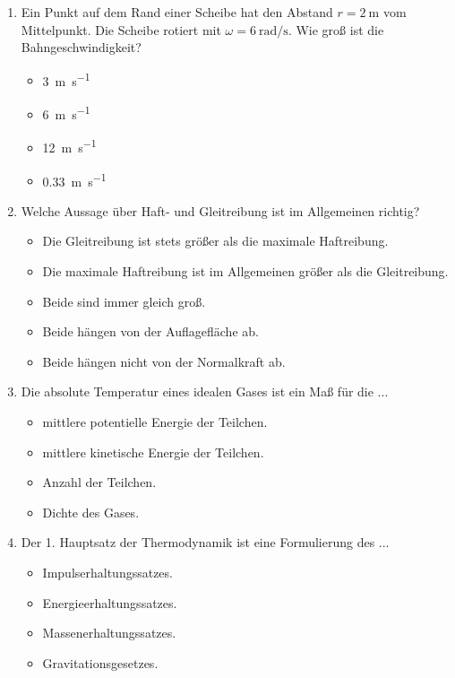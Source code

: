 \documentclass[11pt, a4paper]{article}
\begin{document}
\begin{enumerate}[label=\arabic*.,itemsep=18pt]
    \newpage
    \item Ein Punkt auf dem Rand einer Scheibe hat den Abstand $r = \SI{2}{\metre}$ vom Mittelpunkt. Die Scheibe rotiert mit $\omega = \SI{6}{\radian\per\second}$. Wie groß ist die Bahngeschwindigkeit?
    \begin{itemize}[label={$\square$},itemsep=1pt,topsep=0pt]
        \item \SI{3}{\metre\per\second}
        \item \SI{6}{\metre\per\second}
        \item \SI{12}{\metre\per\second}
        \item \SI{0.33}{\metre\per\second}
    \end{itemize}

    \item Welche Aussage über Haft- und Gleitreibung ist im Allgemeinen richtig?
    \begin{itemize}[label={$\square$},itemsep=1pt,topsep=0pt]
        \item Die Gleitreibung ist stets größer als die maximale Haftreibung.
        \item Die maximale Haftreibung ist im Allgemeinen größer als die Gleitreibung.
        \item Beide sind immer gleich groß.
        \item Beide hängen von der Auflagefläche ab.
        \item Beide hängen nicht von der Normalkraft ab.
    \end{itemize}

    \item Die absolute Temperatur eines idealen Gases ist ein Maß für die ...
    \begin{itemize}[label={$\square$},itemsep=1pt,topsep=0pt]
        \item mittlere potentielle Energie der Teilchen.
        \item mittlere kinetische Energie der Teilchen.
        \item Anzahl der Teilchen.
        \item Dichte des Gases.
    \end{itemize}

    \item Der 1. Hauptsatz der Thermodynamik ist eine Formulierung des ...
    \begin{itemize}[label={$\square$},itemsep=1pt,topsep=0pt]
        \item Impulserhaltungssatzes.
        \item Energieerhaltungssatzes.
        \item Massenerhaltungssatzes.
        \item Gravitationsgesetzes.
    \end{itemize}


\end{enumerate}
\end{document}
